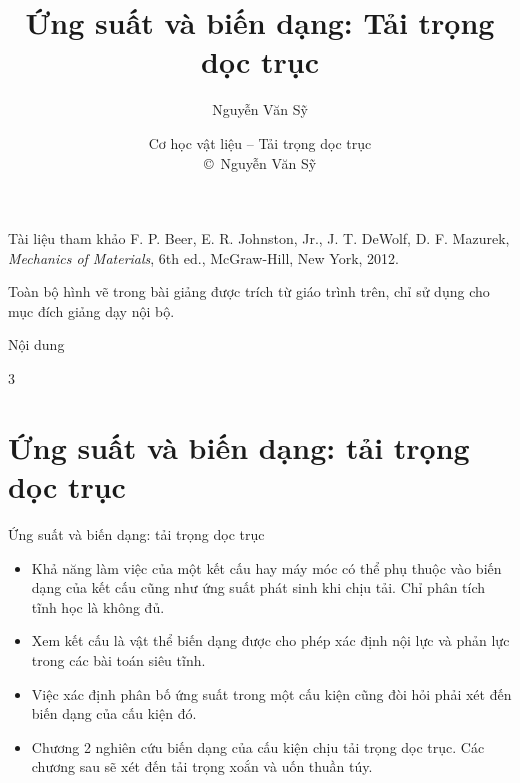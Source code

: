 \documentclass[aspectratio=169]{beamer}
\title[Tải trọng dọc trục]{Ứng suất và biến dạng: Tải trọng dọc trục}
\author[© N. V. Sỹ]{Nguyễn Văn Sỹ}
\institute[TNUT]{%
  Bộ môn Hệ thống Công nghiệp \\
  Trường Đại học Kỹ thuật Công nghiệp \\
  \href{mailto:vansy@tnut.edu.vn}{vansy@tnut.edu.vn}}
\date[Cơ học vật liệu]{\large Cơ học vật liệu – Tải trọng dọc trục \\[0.5em] \footnotesize \copyright\ Nguyễn Văn Sỹ}
\begin{document}
\begin{frame}
  \titlepage
\end{frame}
\begin{frame}{Tài liệu tham khảo}
	\small
	F. P. Beer, E. R. Johnston, Jr., J. T. DeWolf, D. F. Mazurek,
	\emph{Mechanics of Materials}, 6th ed., McGraw-Hill, New York, 2012.
	
	\vspace{1em}
	\footnotesize\color{gray}
	Toàn bộ hình vẽ trong bài giảng được trích từ giáo trình trên, chỉ sử dụng
	cho mục đích giảng dạy nội bộ.
\end{frame}
\begin{frame}[t]{Nội dung}
  \hypertarget{outline}{}
  \tiny
  \begin{multicols}{3}
    \tableofcontents[hideallsubsections]
  \end{multicols}
\end{frame}

\section{Ứng suất và biến dạng: tải trọng dọc trục}
\begin{frame}[t]{Ứng suất và biến dạng: tải trọng dọc trục}
  \small
  \begin{itemize}
    \setlength{\itemsep}{1em}
    \item Khả năng làm việc của một kết cấu hay máy móc có thể phụ thuộc
          vào biến dạng của kết cấu cũng như ứng suất phát sinh khi chịu
          tải. Chỉ phân tích tĩnh học là không đủ.
    \item Xem kết cấu là vật thể biến dạng được cho phép xác định nội
          lực và phản lực trong các bài toán siêu tĩnh.
    \item Việc xác định phân bố ứng suất trong một cấu kiện cũng đòi hỏi
          phải xét đến biến dạng của cấu kiện đó.
    \item Chương 2 nghiên cứu biến dạng của cấu kiện chịu tải trọng dọc
          trục. Các chương sau sẽ xét đến tải trọng xoắn và uốn thuần túy.
  \end{itemize}
\end{frame}
\end{document}

